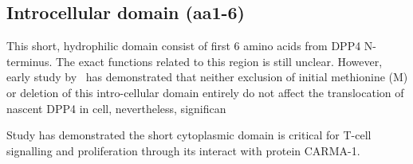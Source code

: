 \subsection{Introcellular domain (aa1-6)}

This short, hydrophilic domain consist of first 6 amino acids from DPP4 N-terminus. The exact functions related to this region is still unclear. However, early study by~\citet{Hong1990} has demonstrated that neither exclusion of initial methionine (M) or deletion of this intro-cellular domain entirely do not affect the translocation of nascent DPP4 in cell, nevertheless, significan

Study has demonstrated the short cytoplasmic domain is critical for T-cell signalling and proliferation through its interact with protein CARMA-1. \cite{Ohnuma_2007}